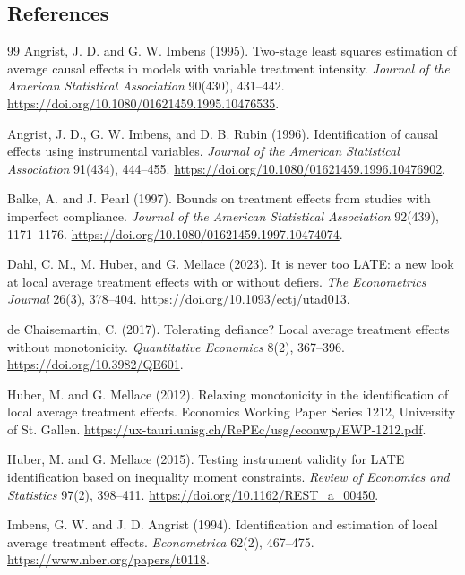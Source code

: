 \documentclass[11pt]{article}
\theoremstyle{definition}
\theoremstyle{plain}
\theoremstyle{remark}
\begin{document}
\subsection*{References}
\begin{thebibliography}{99}
Angrist, J. D. and G. W. Imbens (1995).
\newblock Two-stage least squares estimation of average causal effects in
models with variable treatment intensity.
\newblock \emph{Journal of the American Statistical Association} 90(430),
431--442.
\newblock \url{https://doi.org/10.1080/01621459.1995.10476535}.

Angrist, J. D., G. W. Imbens, and D. B. Rubin (1996).
\newblock Identification of causal effects using instrumental variables.
\newblock \emph{Journal of the American Statistical Association} 91(434),
444--455.
\newblock \url{https://doi.org/10.1080/01621459.1996.10476902}.

Balke, A. and J. Pearl (1997).
\newblock Bounds on treatment effects from studies with imperfect compliance.
\newblock \emph{Journal of the American Statistical Association} 92(439),
1171--1176.
\newblock \url{https://doi.org/10.1080/01621459.1997.10474074}.

Dahl, C. M., M. Huber, and G. Mellace (2023).
\newblock It is never too LATE: a new look at local average treatment effects
with or without defiers.
\newblock \emph{The Econometrics Journal} 26(3), 378--404.
\newblock \url{https://doi.org/10.1093/ectj/utad013}.

de Chaisemartin, C. (2017).
\newblock Tolerating defiance? Local average treatment effects without
monotonicity.
\newblock \emph{Quantitative Economics} 8(2), 367--396.
\newblock \url{https://doi.org/10.3982/QE601}.

Huber, M. and G. Mellace (2012).
\newblock Relaxing monotonicity in the identification of local average
treatment effects.
\newblock Economics Working Paper Series 1212, University of St. Gallen.
\newblock \url{https://ux-tauri.unisg.ch/RePEc/usg/econwp/EWP-1212.pdf}.

Huber, M. and G. Mellace (2015).
\newblock Testing instrument validity for LATE identification based on
inequality moment constraints.
\newblock \emph{Review of Economics and Statistics} 97(2), 398--411.
\newblock \url{https://doi.org/10.1162/REST_a_00450}.

Imbens, G. W. and J. D. Angrist (1994).
\newblock Identification and estimation of local average treatment effects.
\newblock \emph{Econometrica} 62(2), 467--475.
\newblock \url{https://www.nber.org/papers/t0118}.


\end{thebibliography}
\end{document}

